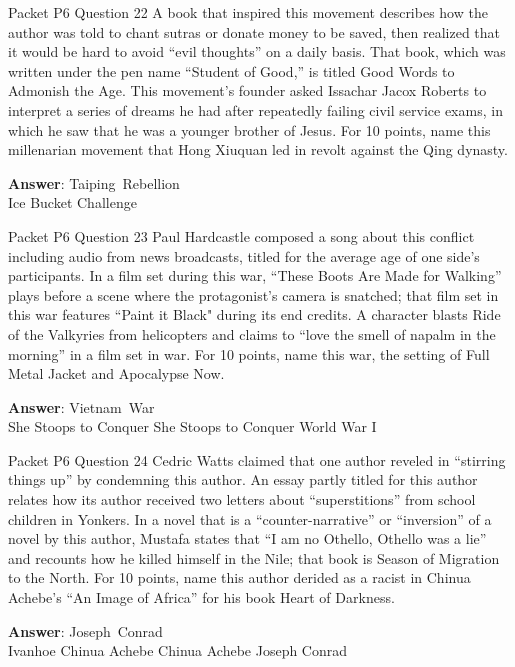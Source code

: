 \begin{frame}{Packet P6 Question 22}
A book that inspired this movement describes how the author was told to chant sutras or donate money to   be saved, then realized that it would be hard to avoid “evil thoughts” on a daily basis. That book, which was written under the pen name “Student of Good,” is titled Good Words to Admonish the Age. This movement’s founder asked Issachar Jacox   Roberts to interpret   a series of dreams   he had after repeatedly failing civil service exams, in which he saw that he was a younger brother of Jesus. For 10 points, name this millenarian movement that Hong Xiuquan led   in revolt against the Qing dynasty.

\textbf{Answer}: Taiping\ Rebellion\\
 Ice Bucket Challenge
\end{frame}

\begin{frame}{Packet P6 Question 23}
Paul Hardcastle composed     a song about this conflict including audio from news broadcasts, titled for the average age of one side’s participants. In a film set during this war, ``These Boots Are Made for Walking'' plays before a scene where the protagonist’s camera is snatched; that film set in this war   features “Paint it Black" during its end   credits. A character blasts Ride of the Valkyries from helicopters and claims to “love the smell of napalm in the morning”   in a film set in war. For 10 points, name this war, the setting of Full Metal Jacket and Apocalypse Now.

\textbf{Answer}: Vietnam\ War\\
 She Stoops to Conquer
 She Stoops to Conquer
 World War I
\end{frame}

\begin{frame}{Packet P6 Question 24}
Cedric Watts claimed that   one author reveled in “stirring things up” by condemning this author. An essay partly titled for this author relates how its author received two letters about ``superstitions'' from school children in Yonkers. In a novel   that is a ``counter-narrative'' or ``inversion'' of a novel by this author, Mustafa states that “I am no Othello, Othello was a lie” and recounts how he killed himself in the Nile; that book is Season of Migration to the North. For 10 points, name this author derided as a racist in Chinua Achebe's “An   Image of Africa” for   his book Heart of Darkness.  

\textbf{Answer}: Joseph\ Conrad\\
 Ivanhoe
 Chinua Achebe
 Chinua Achebe
 Joseph Conrad
\end{frame}

